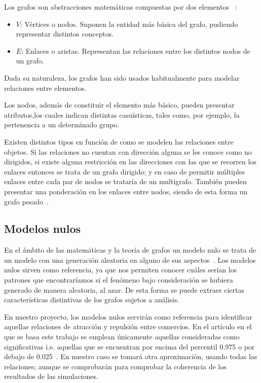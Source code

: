 Los grafos son abstracciones matemáticas compuestas por dos elementos ~\cite{enwiki:1171835383}:

\begin{itemize}
	\item $V$: Vértices o nodos. Suponen la entidad más básica del grafo, pudiendo representar distintos conceptos.
	\item $E$: Enlaces o aristas. Representan las relaciones entre los distintos nodos de un grafo.
\end{itemize}

Dada su naturaleza, los grafos han sido usados habitualmente para modelar relaciones entre elementos.

Los nodos, además de constituir el elemento más básico, pueden presentar atributos,los cuales indican distintas casuísticas, tales como, por ejemplo, la pertenencia a un determinado grupo.

Existen distintos tipos en función de como se modelen las relaciones entre objetos. Si las relaciones no cuentan con dirección alguna se les conoce como no dirigidos, si existe alguna restricción en las direcciones con las que se recorren los enlaces entonces se trata de un grafo dirigido; y en caso de permitir múltiples enlaces entre cada par de nodos se trataría de un multigrafo. También pueden presentar una ponderación en los enlaces entre nodos, siendo de esta forma un grafo pesado~\cite{enwiki:1171835383}.

\subsection{Modelos nulos}

En el ámbito de las matemáticas y la teoría de grafos un modelo nulo se trata de un modelo con una generación aleatoria en alguno de sus aspectos~\cite{enwiki:1169838323}. Los modelos nulos sirven como referencia, ya que nos permiten conocer cuáles serían los patrones que encontraríamos si el fenómeno bajo consideración se hubiera generado de manera aleatoria, al azar. De esta forma se puede extraer ciertas características distintivas de los grafos sujetos a análisis.

En nuestro proyecto, los modelos nulos servirán como referencia para identificar aquellas relaciones de atracción y repulsión entre comercios. En el artículo en el que se basa este trabajo se emplean únicamente aquellas consideradas como significativas i.e. aquellas que se encuentran por encima del percentil 0.975 o por debajo de 0.025~\cite{Ahedo2021}. En nuestro caso se tomará otra aproximación, usando todas las relaciones; aunque se comprobarán para comprobar la coherencia de los resultados de las simulaciones.

